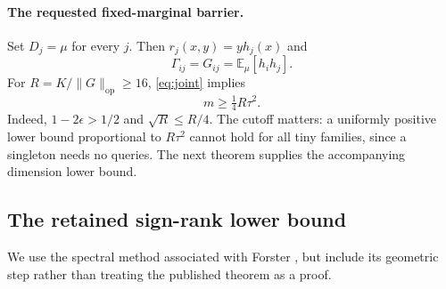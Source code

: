 \documentclass[11pt]{article}
\newcommand{\E}{\mathbb E}
\newcommand{\1}{\mathbf 1}
\newcommand{\op}{\mathrm{op}}
\begin{document}
\paragraph{The requested fixed-marginal barrier.}
Set $D_j=\mu$ for every $j$. Then $r_j(x,y)=y h_j(x)$ and
\[
 \Gamma_{ij}=G_{ij}=\E_\mu[h_i h_j].
\]
For $R=K/\|G\|_\op\geq16$, \eqref{eq:joint} implies
\begin{equation}\label{eq:fixed}
 m\geq\tfrac14 R\tau^2.
\end{equation}
Indeed, $1-2\epsilon>1/2$ and $\sqrt R\leq R/4$. The cutoff matters: a uniformly positive lower bound proportional to $R\tau^2$ cannot hold for all tiny families, since a singleton needs no queries. The next theorem supplies the accompanying dimension lower bound.

\subsection{The retained sign-rank lower bound}
We use the spectral method associated with Forster \citep{Forster02}, but include its geometric step rather than treating the published theorem as a proof.
\end{document}
